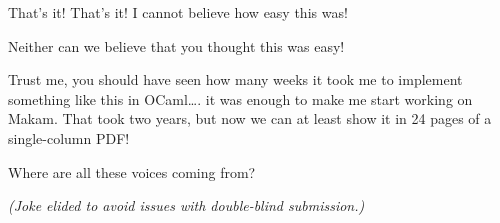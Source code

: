 \heroSTUDENT{} That's it! That's it! I cannot believe how easy this was!

\heroAUDIENCE{} Neither can we believe that you thought this was easy!

\heroAUTHOR{} Trust me, you should have seen how many weeks it took me to
implement something like this in OCaml\ldots{}. it was enough to make me
start working on Makam. That took two years, but now we can at least
show it in 24 pages of a single-column PDF!

\heroADVISOR{} Where are all these voices coming from?

\heroSTUDENT{}
\textit{(Joke elided to avoid issues with double-blind submission.)}
